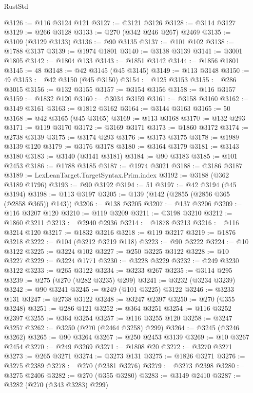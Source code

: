 \begin{lexlean}{RustStd}
\begin{coremodule}
@3126 := @116 @3124 @121
@3127 := @3121 @3126
@3128 := @3114 @3127
@3129 := @266 @3128
@3133 := @270 (@342 @246 @267) @2469
@3135 := @3109 (@3129 @3133)
@3136 := @90 @3135
@3137 := @101 @102
@3138 := @1788 @3137
@3139 := @1974 @1801
@3140 := @3138 @3139
@3141 := @3001 @1805
@3142 := @1804 @133
@3143 := @1851 @3142
@3144 := @1856 @1801
@3145 := 48
@3148 := @42 @3145 (@45 @3145)
@3149 := @113 @3148
@3150 := 49
@3153 := @42 @3150 (@45 @3150)
@3154 := @125 @3153
@3155 := @286 @3015
@3156 := @132 @3155
@3157 := @3154 @3156
@3158 := @116 @3157
@3159 := @1832 @120
@3160 := @3034 @3159
@3161 := @3158 @3160
@3162 := @3149 @3161
@3163 := @1812 @3162
@3164 := @3144 @3163
@3165 := 50
@3168 := @42 @3165 (@45 @3165)
@3169 := @113 @3168
@3170 := @132 @293
@3171 := @119 @3170
@3172 := @3169 @3171
@3173 := @1860 @3172
@3174 := @2738 @3139
@3175 := @3174 @293
@3176 := @3173 @3175
@3178 := @1989 @3139 @120
@3179 := @3176 @3178
@3180 := @3164 @3179
@3181 := @3143 @3180
@3183 := @3140 (@3141 @3181)
@3184 := @90 @3183
@3185 := @101 @2453
@3186 := @1788 @3185
@3187 := @1974 @3021
@3188 := @3186 @3187
@3189 := LexLeanTarget.TargetSyntax.Prim.index
@3192 := @3188 (@362 @3189 @1796)
@3193 := @90 @3192
@3194 := 51
@3197 := @42 @3194 (@45 @3194)
@3198 := @113 @3197
@3205 := @139 (@142 (@2855 (@2856 @365 (@2858 @365)) @143))
@3206 := @138 @3205
@3207 := @137 @3206
@3209 := @116 @3207 @120
@3210 := @119 @3209
@3211 := @3198 @3210
@3212 := @1860 @3211
@3213 := @2940 @2936
@3214 := @1878 @3213
@3216 := @116 @3214 @120
@3217 := @1832 @3216
@3218 := @119 @3217
@3219 := @1876 @3218
@3222 := @104 (@3212 @3219 @118)
@3223 := @90 @3222
@3224 := @10 @3122
@3225 := @3224 @102
@3227 := @250 @3225 @3122
@3228 := @10 @3227
@3229 := @3224 @1771
@3230 := @3228 @3229
@3232 := @249 @3230 @3122
@3233 := @265 @3122
@3234 := @3233 @267
@3235 := @3114 @295
@3239 := @275 (@270 (@282 @3235) @299)
@3241 := @3232 (@3234 @3239)
@3242 := @90 @3241
@3245 := @249 (@101 @3225) @3122
@3246 := @3233 @131
@3247 := @2738 @3122
@3248 := @3247 @2397
@3250 := @270 (@355 @3248)
@3251 := @286 @121
@3252 := @364 @3251
@3254 := @116 @3252 @2397
@3255 := @364 @3254
@3257 := @116 @3255 @120
@3258 := @3247 @3257
@3262 := @3250 (@270 (@2464 @3258) @299)
@3264 := @3245 (@3246 @3262)
@3265 := @90 @3264
@3267 := @250 @2453 @3139
@3269 := @10 @3267 @2454
@3270 := @249 @3269
@3271 := @1808 @20
@3272 := @3270 @3271
@3273 := @265 @3271
@3274 := @3273 @131
@3275 := @1826 @3271
@3276 := @3275 @2389
@3278 := @270 (@2381 @3276)
@3279 := @3273 @2398
@3280 := @3275 @2406
@3282 := @270 (@355 @3280)
@3283 := @3149 @2410
@3287 := @3282 (@270 (@343 @3283) @299)

\end{coremodule}
\end{lexlean}
